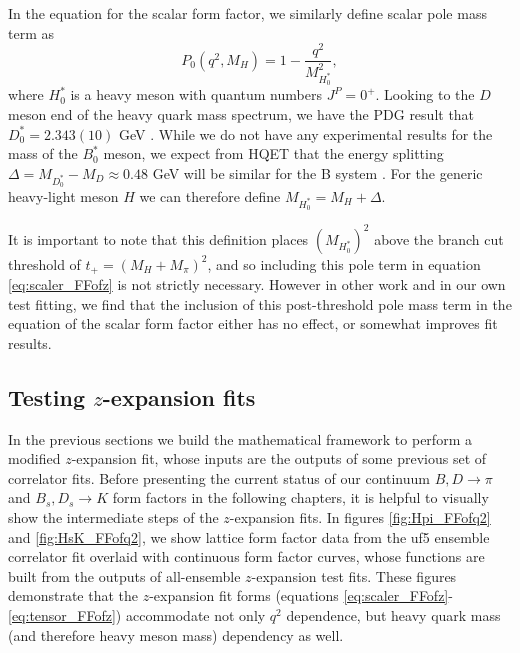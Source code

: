 In the equation for the scalar form factor, we similarly define scalar pole mass term as
\begin{equation}\label{eq:scalar_pole_term}
    P_0(q^2,M_H) = 1 - \frac{q^2}{{M^2_{H_0^{*}}}},
\end{equation}
where $H_0^{*}$ is a heavy meson with quantum numbers $J^P=0^+$.  Looking to the $D$ meson end of the heavy quark mass spectrum, we have the PDG  result that $D_0^{*}=2.343(10)$ GeV \cite{ParticleDataGroup:2024cfk}.  While we do not have any experimental results for the mass of the $B_0^{*}$ meson, we expect from HQET that the energy splitting $\Delta = M_{D_0^{*}} - M_D \approx 0.48$ GeV will be similar for the B system \cite{10.1093/ptep/ptaf138}.  For the generic heavy-light meson $H$ we can therefore define $M_{H_0^{*}} = M_H + \Delta$.

It is important to note that this definition places $(M_{H_0^{*}})^2$ above the branch cut threshold of $t_+ = (M_H+M_\pi)^2$, and so including this pole term in equation \ref{eq:scaler_FFofz} is not strictly necessary. However in other work \cite{PhysRevD.92.116001} and in our own test fitting, we find that the inclusion of this post-threshold pole mass term in the equation of the scalar form factor either has no effect, or somewhat improves fit results.

\subsection{Testing $z$-expansion fits}
In the previous sections we build the mathematical framework to perform a modified $z$-expansion fit, whose inputs are the outputs of some previous set of correlator fits.  Before presenting the current status of our continuum $B,D\rightarrow \pi$ and $B_s,D_s \rightarrow K$ form factors in the following chapters, it is helpful to visually show the intermediate steps of the $z$-expansion fits.  In figures \ref{fig:Hpi_FFofq2} and \ref{fig:HsK_FFofq2}, we show lattice form factor data from the uf5 ensemble correlator fit overlaid with continuous form factor curves, whose functions are built from the outputs of all-ensemble $z$-expansion test fits.  These figures demonstrate that the $z$-expansion fit forms (equations \ref{eq:scaler_FFofz}-\ref{eq:tensor_FFofz}) accommodate not only $q^2$ dependence, but heavy quark mass (and therefore heavy meson mass) dependency as well.

